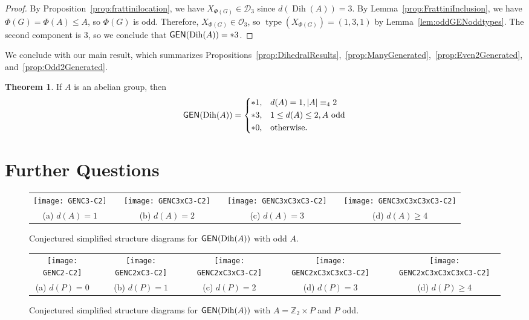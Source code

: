 \documentclass[12pt]{amsart}
\theoremstyle{definition}
\newtheorem{theorem}[equation]{Theorem}
\theoremstyle{definition}
\numberwithin{equation}{section}
\begin{document}
\begin{proof}
By Proposition~\ref{prop:frattinilocation}, we have $X_{\Phi(G)} \in \mathcal{D}_3$ since ${d}({\operatorname{Dih}}(A))=3$.   
By Lemma~\ref{prop:FrattiniInclusion}, we have $\Phi(G)=\Phi(A) \leq A$, so $\Phi(G)$ is odd.  
Therefore,  $X_{\Phi(G)} \in  \mathcal{O}_3$, so ${\operatorname{type}}(X_{\Phi(G)})=(1,3,1)$ by Lemma~\ref{lem:oddGENoddtypes}.
The second component is $3$, so we conclude that ${\text{\sf GEN}}({\operatorname{Dih}}(A))=*3$. 
\end{proof}

We conclude with our main result, which summarizes Propositions~\ref{prop:DihedralResults},~\ref{prop:ManyGenerated},~\ref{prop:Even2Generated}, and~\ref{prop:Odd2Generated}. 

\begin{theorem}
If $A$ is an abelian group, then 
\[
{\text{\sf GEN}}({\operatorname{Dih}}(A))=
\begin{dcases}
*1, & {d}(A)=1, |A|\equiv_4 2\\
*3, & 1\le{d}(A)\le2, A \text{ odd}\\
*0, & \text{otherwise}. 
\end{dcases}
\]

\end{theorem}

\section{Further Questions}

\begin{figure}
\begin{tabular}{ccccccc}
\texttt{[image: GENC3-C2]} &  & \texttt{[image: GENC3xC3-C2]} &  & \texttt{[image: GENC3xC3xC3-C2]} &  & \texttt{[image: GENC3xC3xC3xC3-C2]}\tabularnewline
(a) ${d}(A)=1$ &  & (b) ${d}(A)=2$ &  & (c) ${d}(A)=3$ &  & (d) ${d}(A)\ge4$\tabularnewline
\end{tabular}

\protect\caption{\label{fig:genodd}Conjectured simplified structure diagrams for $\protect{\text{\sf GEN}}(\protect{\operatorname{Dih}}(A))$
with odd $A$.}
\end{figure}

\begin{figure}
\begin{tabular}{ccccccccc}
\texttt{[image: GENC2-C2]} &  & \texttt{[image: GENC2xC3-C2]} &  & \texttt{[image: GENC2xC3xC3-C2]} &  & \texttt{[image: GENC2xC3xC3xC3-C2]} &  & \texttt{[image: GENC2xC3xC3xC3xC3-C2]}\tabularnewline
(a) ${d}(P)=0$ &  & (b) ${d}(P)=1$  &  & (c) ${d}(P)=2$ &  & (d) ${d}(P)=3$ &  & (d) ${d}(P)\ge4$\tabularnewline
\end{tabular}

\protect\caption{\label{fig:genevenpow1}Conjectured simplified structure diagrams for $\protect{\text{\sf GEN}}(\protect{\operatorname{Dih}}(A))$
with $A=\mathbb{Z}_{2}\times P$ and $P$ odd.}
\end{figure}
\end{document}
